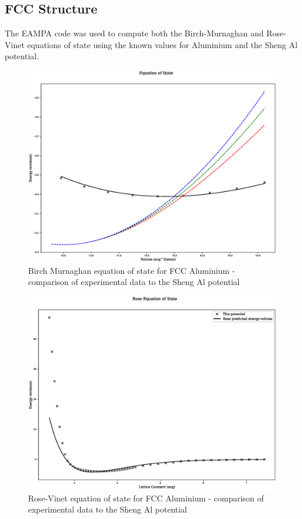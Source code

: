 \subsection{FCC Structure}

The EAMPA code was used to compute both the Birch-Murnaghan and Rose-Vinet equations of state using the known values for Aluminium and the Sheng Al potential\cite{shengeamonline}.  
 
\begin{figure}
  \begin{center}
    \includegraphics[width=0.6\linewidth]{appendix/transferability/transferability/Fe_mhsasa/equation_of_state_bp_fcc.eps}
  \end{center}
	\caption{Birch Murnaghan equation of state for FCC Aluminium - comparison of experimental data to the Sheng Al potential}
	\label{fig:shengalfccbm}
\end{figure}

\begin{figure}
  \begin{center}
    \includegraphics[width=0.6\linewidth]{appendix/transferability/transferability/Fe_mhsasa/rose_plot_bp_fcc.eps}
  \end{center}
	\caption{Rose-Vinet equation of state for FCC Aluminium - comparison of experimental data to the Sheng Al potential}
	\label{fig:shengalfccbm}
\end{figure}















